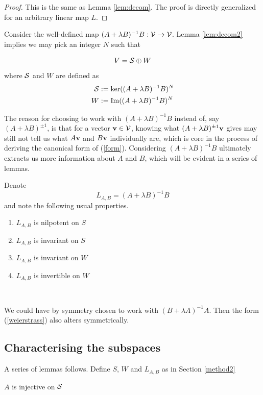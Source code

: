 \begin{proof}
  This is the same as Lemma \ref{lem:decom}. The proof is directly generalized for an arbitrary linear map $L$.
\end{proof}

Consider the well-defined map $(A+\lambda B)^{-1}B:\mathcal{V}\rightarrow \mathcal{V}$. Lemma \ref{lem:decom2} implies we may pick an integer $N$ such that

\begin{equation}\label{plus}
    V=\mathcal{S} \oplus W
\end{equation}
where $\mathcal{S}$ and $W$ are defined as
\begin{align}
    \mathcal{S}&:=\ker ((A+\lambda B)^{-1}B)^N\\
    W&:=\operatorname{Im} ((A+\lambda B)^{-1}B)^N
\end{align}
\begin{remark}
    The reason for choosing to work with $(A+\lambda B)^{-1}B$ instead of, say  $(A+\lambda B)^{\pm1}$, is that for a vector $\mathbf{v} \in \mathcal{V}$, knowing what $(A+\lambda B)^{\pm 1}\mathbf{v}$ gives may still not tell us what $A\mathbf{v}$ and $B\mathbf{v}$ individually are, which is core in the process of deriving the canonical form of (\ref{form}). Considering $(A+\lambda B)^{-1}B$ ultimately extracts us more information about $A$ and $B$, which will be evident in a series of lemmas.
\end{remark}
Denote $$\boxed{L_{A,B}=(A+\lambda B)^{-1}B}$$and note the following usual properties.
\begin{property}
    \mbox{}
\begin{enumerate}
    \item \label{first} $L_{A,B}$ is nilpotent on $S$
    \item \label{2nd} $L_{A,B}$ is invariant on $S$
    \item \label{3rd} $L_{A,B}$ is invariant on $W$
    \item \label{4th} $L_{A,B}$ is invertible on $W$
\end{enumerate}
\end{property}
\

\begin{remark}
    We could have by symmetry chosen to work with $(B+\lambda A)^{-1}A$. Then the form (\ref{weierstrass}) also alters symmetrically.
\end{remark}

\subsection{Characterising the subspaces}
A series of lemmas follows. Define $S$, $W$ and $L_{A,B}$ as in Section \ref{method2}
\begin{lemma}\label{injectivityA}
    $A$ is injective on $\mathcal{S}$
\end{lemma}

